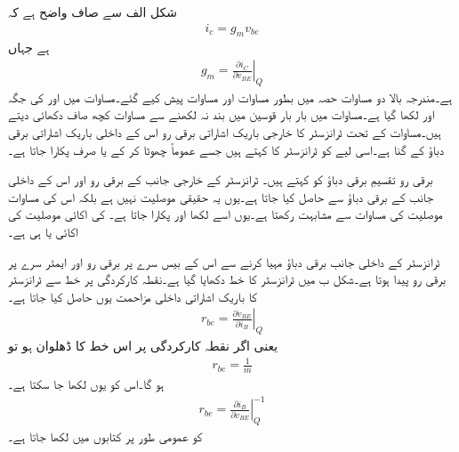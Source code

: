 شکل   الف سے صاف واضح ہے کہ
\begin{align}\label{مساوات_ٹرانزسٹر_رو_بذریعہ_موصلیت}
i_c = g_m v_{be}
\end{align}
ہے  جہاں
\begin{align} \label{مساوات_ٹرانزسٹر_نکتہ_مائل_پر_موصلیت_نما}
g_m = \left. \frac{\partial i_C}{\partial v_{BE}}\right |_Q
\end{align}
 ہے۔مندرجہ بالا دو مساوات حصہ  میں بطور مساوات   اور مساوات   پیش کیے گئے۔مساوات   میں  اور  کی جگہ  اور  لکھا گیا ہے۔مساوات میں بار بار قوسین میں بند   نہ لکھنے سے مساوات کچھ صاف دکھائی دیتے ہیں۔مساوات   کے تحت ٹرانزسٹر کا خارجی باریک اشاراتی برقی رو  اس کے داخلی باریک اشاراتی برقی دباؤ  کے  گنا ہے۔اسی لیے  کو ٹرانزسٹر کا   کہتے ہیں جسے عموماً چھوٹا کر کے  یا صرف   پکارا جاتا ہے۔

برقی رو تقسیمِ برقی دباؤ کو  کہتے ہیں۔ ٹرانزسٹر کے خارجی جانب  کے برقی رو اور اس کے داخلی جانب کے برقی دباؤ سے حاصل کیا جاتا ہے۔یوں یہ حقیقی موصلیت نہیں ہے بلکہ اس کی مساوات موصلیت کی مساوات سے مشابہت رکھتا ہے۔یوں اسے  لکھا اور  پکارا جاتا ہے۔ کی اکائی موصلیت کی اکائی  یا  ہی ہے۔


ٹرانزسٹر کے داخلی جانب برقی دباؤ  مہیا کرنے سے اس کے بیس سرے پر برقی رو  اور ایمٹر سرے پر برقی رو  پیدا ہوتا ہے۔شکل   ب میں ٹرانزسٹر کا  خط دکھایا گیا ہے۔نقطہ کارکردگی پر  خط سے ٹرانزسٹر کا باریک اشاراتی داخلی مزاحمت  یوں حاصل کیا جاتا ہے۔
\begin{align}
r_{be}=\left. \frac{\partial v_{BE}}{\partial i_B} \right |_Q
\end{align}
یعنی اگر نقطہ کارکردگی پر اس خط کا ڈھلوان  ہو تو 
\begin{align*}
r_{be}=\frac{1}{m}
\end{align*}
ہو گا۔اس کو یوں لکھا جا سکتا ہے۔
\begin{align}
r_{be}=\left. \frac{\partial i_B}{\partial v_{BE}}  \right |_Q^{-1}
\end{align}
 کو عمومی طور پر کتابوں میں  لکھا جاتا ہے۔

